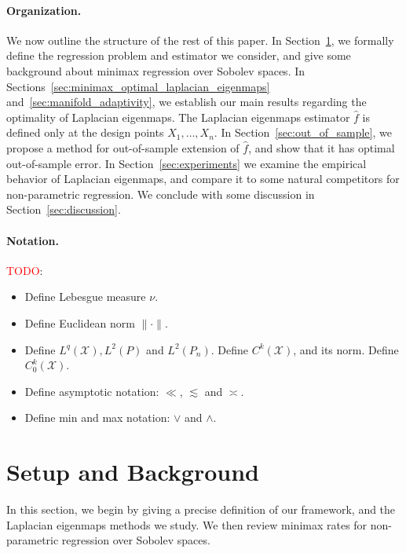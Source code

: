 \documentclass{article}
\newcommand{\1}{\mathbf{1}}
\newcommand{\Leb}{L}
\newcommand{\mc}[1]{\mathcal{#1}}
\newcommand{\wh}[1]{\widehat{#1}}
\theoremstyle{alden}
\theoremstyle{aldenthm}
\theoremstyle{definition}
\theoremstyle{remark}
\begin{document}
\paragraph{Organization.}

We now outline the structure of the rest of this paper. In Section~\ref{sec:setup_main_results}, we formally define the regression problem and estimator we consider, and give some background about minimax regression over Sobolev spaces. In Sections~\ref{sec:minimax_optimal_laplacian_eigenmaps} and~\ref{sec:manifold_adaptivity}, we establish our main results regarding the optimality of Laplacian eigenmaps. The Laplacian eigenmaps estimator $\wh{f}$ is defined only at the design points $X_1,\ldots,X_n$. In Section~\ref{sec:out_of_sample}, we propose a method for out-of-sample extension of $\wh{f}$, and show that it has optimal out-of-sample error. In Section~\ref{sec:experiments} we examine the empirical behavior of Laplacian eigenmaps, and compare it to some natural competitors for non-parametric regression. We conclude with some discussion in Section~\ref{sec:discussion}.

\paragraph{Notation.}

\textcolor{red}{TODO}: 

\begin{itemize}
	\item Define Lebesgue measure $\nu$. 
	\item Define Euclidean norm $\|\cdot\|$.
	\item Define $\Leb^q(\mc{X}), \Leb^2(P)$ and $\Leb^2(P_n)$. Define $C^k(\mc{X})$, and its norm. Define $C_0^k(\mc{X})$.
	\item Define asymptotic notation: $\ll$, $\lesssim$ and $\asymp$.
	\item Define min and max notation: $\vee$ and $\wedge$.
\end{itemize}

\section{Setup and Background}
\label{sec:setup_main_results}

In this section, we begin by giving a precise definition of our framework, and the Laplacian eigenmaps methods we study. We then review minimax rates for non-parametric regression over Sobolev spaces.
\end{document}
